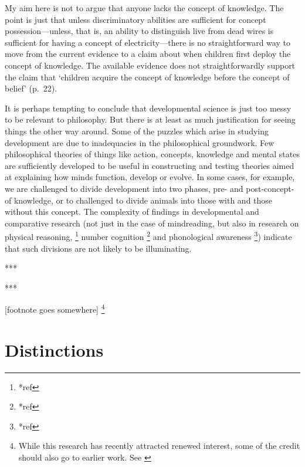 \documentclass[11pt,a4paper]{extarticle}
\begin{document}
My aim here is not to argue that anyone lacks the concept of knowledge.
The point is just that unless discriminatory abilities are sufficient for  concept possession---unless, that is, an ability to distinguish live from dead wires is sufficient for having a concept of electricity---there is no straightforward way to move from the current evidence to a claim about when children first deploy the concept of knowledge.
The available evidence does not  straightforwardly support the claim that `children acquire the concept of knowledge before the concept of belief' (p.\ 22).

It is perhaps tempting to conclude that developmental science is just too messy to be relevant to philosophy.
But there is at least as much justification for seeing things the other way around.
Some of the puzzles which arise in studying development are due to inadequacies in the philosophical groundwork.
Few philosophical theories of things like action, concepts, knowledge and mental states are sufficiently developed to be useful in constructing and testing theories aimed at explaining 
 how minds function, develop or evolve.
In some cases, for example, we are challenged to divide development into two phases, pre- and post-concept-of knowledge, or to challenged to divide animals into those with and those without this concept.
The complexity of findings in developmental and comparative research (not just in the case of mindreading, but also in research on physical reasoning,%
\footnote{
*ref
}
number cognition%
\footnote{
*ref
}
and phonological awareness%
\footnote{
*ref
}) 
indicate that such divisions are not likely to be illuminating.





***

***

[footnote goes somewhere]%
\footnote{
While this research has recently attracted renewed interest, some of the credit should also go to earlier work. 
See \citet{Clements:1994cw,Garnham:2001jm,Garnham:2001ql,Ruffman:2001ng}
}


%

 
 

\section{Distinctions}
\end{document}
